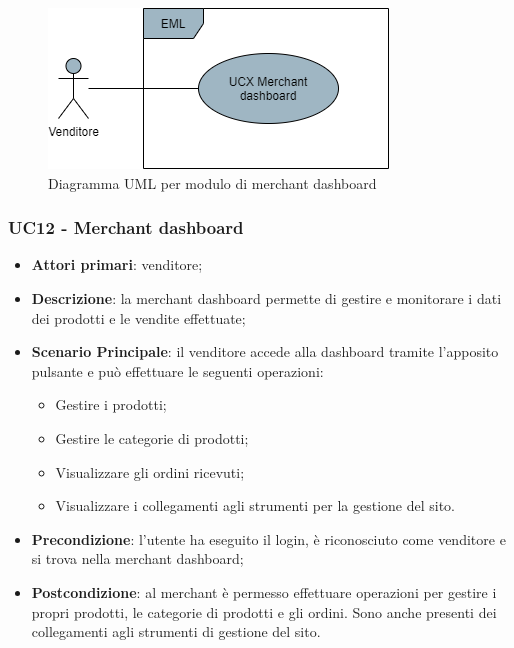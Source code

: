 \begin{figure}[H]
\centering
\includegraphics[scale=0.6]{res/UseCase/Immagini/MerchantDashboardGenerale}
\caption{Diagramma UML per modulo di merchant dashboard}
\end{figure}

\subsubsection{UC12 - Merchant dashboard}
\begin{itemize}
\item \textbf{Attori primari}: venditore;
\item \textbf{Descrizione}: la merchant dashboard permette di gestire e monitorare i dati dei prodotti e le vendite effettuate;
\item \textbf{Scenario Principale}: il venditore accede alla dashboard tramite l'apposito pulsante e può effettuare le seguenti operazioni:
\begin{itemize}
	\item Gestire i prodotti;
	\item Gestire le categorie di prodotti;
	\item Visualizzare gli ordini ricevuti;
	\item Visualizzare i collegamenti agli strumenti per la gestione del sito.
\end{itemize}
\item \textbf{Precondizione}: l'utente ha eseguito il login, è riconosciuto come venditore e si trova nella merchant dashboard;
\item \textbf{Postcondizione}: al merchant è permesso effettuare operazioni per gestire i propri prodotti, le categorie di prodotti e gli ordini. Sono anche presenti dei collegamenti agli strumenti di gestione del sito.
\end{itemize}

